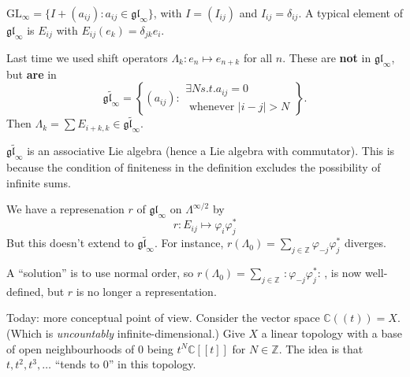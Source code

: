 $\text{GL}_\infty=\{I+(a_{ij}):a_{ij}
\in\mathfrak{gl}_\infty\}$,
with $I=(I_{ij})$ and $I_{ij}=\delta_{ij}$.
A typical element of $\mathfrak{gl}_\infty$
is $E_{ij}$ with
$E_{ij}(e_k)=\delta_{jk}e_i$.

Last time we used shift operators
$\Lambda_k:e_n\mapsto e_{n+k}$ for all $n$.
These are {\bf not} in
$\mathfrak{gl}_\infty$,
but {\bf are} in
$$
\widetilde{\mathfrak{gl}_\infty}
=\left\{(a_{ij}):\substack{\exists  N s.t.
a_{ij}=0 \\ \text{ whenever }
|i-j|>N}\right\}.
$$
Then $\Lambda_k=\sum E_{i+k,k}\in
\widetilde{\mathfrak{gl}_\infty}$.

\begin{remark}
\label{remark-gltilde-is-Lie-algebra}
$\widetilde{\mathfrak{gl}_\infty}$ is an
associative
Lie algebra (hence a Lie algebra with
commutator).
This is because the condition of finiteness
in the definition
excludes the possibility of infinite sums.
\end{remark}


We have a represenation $r$ of
$\mathfrak{gl}_\infty$
on $\Lambda^{\infty/2}$ by
$$
r:E_{ij}\mapsto \varphi_i\varphi_j^*
$$
But this doesn't extend to
$\widetilde{\mathfrak{gl}_\infty}$.
For instance, $r(\Lambda_0)=\sum_{j \in
\mathbb{Z}}\varphi_{-j}\varphi^*_j$
diverges.

A ``solution'' is to use normal order,
so $r(\Lambda_0)=\sum_{j \in
\mathbb{Z}}\,:\!\varphi_{-j}\varphi^*_j\!:\,
$,
is now well-defined, but $r$ is no longer a
representation.

\medskip\noindent
Today: more conceptual point of view.
Consider the vector space
$\mathbb{C}(\!(t)\!)=X$.
(Which is {\it uncountably}
infinite-dimensional.)
Give $X$ a linear topology
with a base of open neighbourhoods
of $0$ being $t^N\mathbb{C}[\![t]\!]$
for $N \in \mathbb{Z}$.
The idea is that
$t,t^2,t^3,\ldots$ ``tends to $0$''
in this topology.

